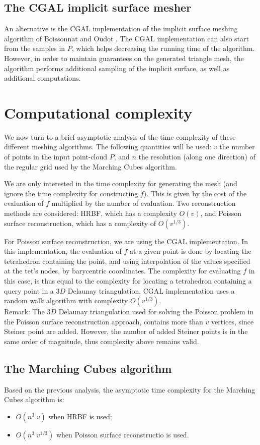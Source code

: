 \documentclass{article}
\begin{document}
\subsection{The CGAL implicit surface mesher}
An alternative is the CGAL implementation of the implicit surface meshing algorithm of Boissonnat and Oudot \cite{BO05}.
The CGAL implementation can also start from the samples in $P$, which helps decreasing the running time of the algorithm. However, in order to maintain guarantees on the generated triangle mesh, the algorithm performs additional sampling of the implicit surface, as well as additional computations. 


\section{Computational complexity}
\label{sec:mesh_comp_time}
We now turn to a brief asymptotic analysis of the time complexity of these different meshing algorithms. 
The following quantities will be used: $v$ the number of points in the input point-cloud $P$, 
and $n$ the resolution (along one direction) of the regular grid used by the Marching Cubes algorithm.

We are only interested in the time complexity for generating the mesh (and ignore the time complexity for constructing $f$). 
This is given by the cost of the evaluation of $f$ multiplied by the number of evaluation. 
Two reconstruction methods are considered: 
HRBF, which has a complexity $O(v)$, and Poisson surface reconstruction, which has a complexity of $O(v^{1/3})$.
 
For Poisson surface reconstruction, we are using the CGAL implementation. In this implementation, the evaluation of $f$ at a given point is done by locating the tetrahedron containing the point, and using interpolation of the values specified at the tet's nodes, by barycentric coordinates. The complexity for evaluating $f$ in this case, is thus equal to the complexity for locating a tetrahedron containing a query point in a $3D$ Delaunay triangulation. CGAL implementation uses a random walk algorithm with complexity $O(v^{1/3})$. 
\\
Remark: The $3D$ Delaunay triangulation used for solving the Poisson problem in the Poisson surface reconstruction approach, contains more than $v$ vertices, since Steiner point are added. However, the number of added Steiner points is in the same order of magnitude, thus complexity above remains valid.

\subsection{The Marching Cubes algorithm}
Based on the previous analysis, the asymptotic time complexity for the Marching Cubes algorithm is:
\begin{itemize}
\item $O(n^3 \; v)$ when HRBF is used;
\item $O(n^3 \; v^{1/3})$ when Poisson surface reconstructio is used.
\end{itemize}
\end{document}
